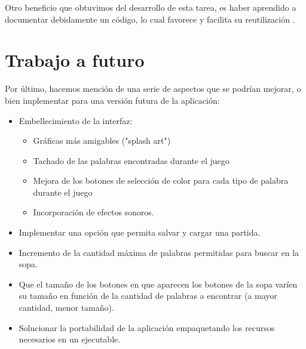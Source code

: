 Otro beneficio que obtuvimos del desarrollo de esta tarea, es haber aprendido a documentar debidamente un código, lo cual favorece y facilita su reutilización .

\section{Trabajo a futuro}
Por último, hacemos mención de una serie de aspectos que se podrían mejorar, o bien implementar para una versión futura de la aplicación:
\begin{itemize}
\item Embellecimiento de la interfaz: 
\begin{itemize} 
	\item Gráficas más amigables ("splash art")
	\item Tachado de las palabras encontradas durante el juego
	\item Mejora de los botones de selección de color para cada tipo de palabra durante el juego
	\item Incorporación de efectos sonoros.
\end{itemize}
\item  Implementar una opción que permita salvar y cargar una partida.
\item  Incremento de la cantidad máxima de palabras permitidas para buscar en la sopa.
\item  Que el tamaño de los botones en que aparecen los botones de la sopa varíen su tamaño en función de la cantidad de palabras a encontrar (a mayor cantidad, menor tamaño).
\item  Solucionar la portabilidad de la aplicación empaquetando los recursos necesarios en un ejecutable.
\end{itemize}